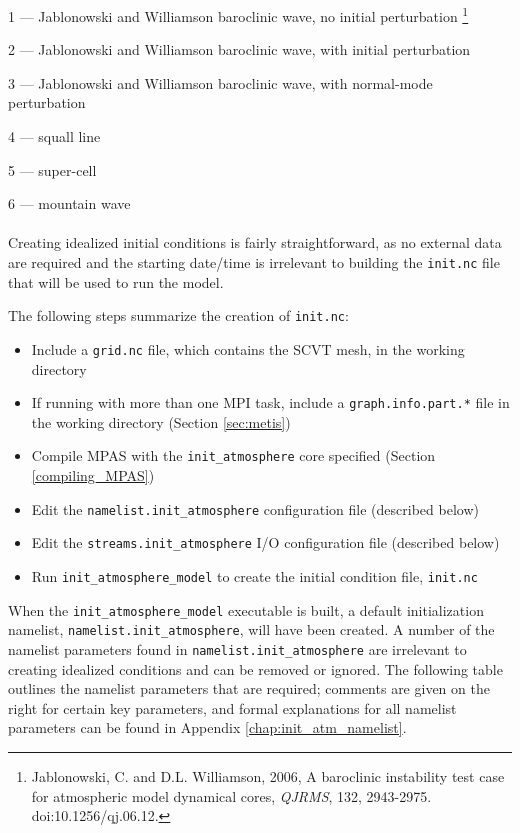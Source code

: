 1 --- Jablonowski and Williamson baroclinic wave, no initial perturbation
\footnote{Jablonowski, C. and D.L. Williamson, 2006, A baroclinic instability test case for atmospheric model dynamical cores, {\em QJRMS}, 132, 2943-2975. doi:10.1256/qj.06.12.}

2 --- Jablonowski and Williamson baroclinic wave, with initial perturbation

3 --- Jablonowski and Williamson baroclinic wave, with normal-mode perturbation

4 --- squall line

5 --- super-cell

6 --- mountain wave\\
\\
Creating idealized initial conditions is fairly straightforward, as no external data are required and the starting date/time is irrelevant to building the {\tt init.nc} file that will be used to run the model.

The following steps summarize the creation of {\tt init.nc}:

\begin{itemize}
\item Include a {\tt grid.nc} file, which contains the SCVT mesh, in the working directory
\item If running with more than one MPI task, include a {\tt graph.info.part.*} file in the working directory (Section \ref{sec:metis})
\item Compile MPAS with the {\tt init\_atmosphere} core specified (Section \ref{compiling_MPAS})
\item Edit the {\tt namelist.init\_atmosphere} configuration file (described below)
\item Edit the {\tt streams.init\_atmosphere} I/O configuration file (described below)
\item Run {\tt init\_atmosphere\_model} to create the initial condition file, {\tt init.nc}
\end{itemize}

When the {\tt init\_atmosphere\_model} executable is built, a default initialization namelist, {\tt namelist.init\_atmosphere}, will have been created. A number of the namelist parameters found in {\tt namelist.init\_atmosphere} are irrelevant to creating idealized conditions and can be removed or ignored.  The following table outlines the namelist parameters that are required; comments are given on the right for certain key parameters, and formal explanations for all namelist parameters can be found in Appendix \ref{chap:init_atm_namelist}.



